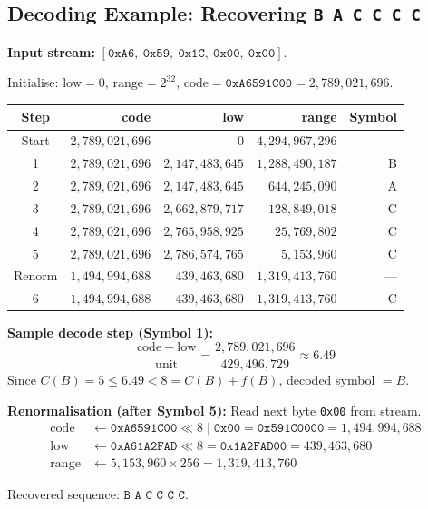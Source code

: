 \subsection{Decoding Example: Recovering \texttt{B A C C C C}}

\begin{examplebox}
\textbf{Input stream:}
$[\texttt{0xA6},\ \texttt{0x59},\ \texttt{0x1C},\ \texttt{0x00},
\ \texttt{0x00}]$.

Initialise: $\mathrm{low}=0$, $\mathrm{range}=2^{32}$,
$\mathrm{code} = \texttt{0xA6591C00} = 2{,}789{,}021{,}696$.

\medskip
\begin{center}
\begin{tabular}{@{}crrrr@{}}
\toprule
\textbf{Step} & \textbf{code} & \textbf{low} & \textbf{range} 
              & \textbf{Symbol} \\
\midrule
Start  & $2{,}789{,}021{,}696$ & $0$ & $4{,}294{,}967{,}296$ & — \\
1 & $2{,}789{,}021{,}696$ & $2{,}147{,}483{,}645$ & $1{,}288{,}490{,}187$ & B \\
2 & $2{,}789{,}021{,}696$ & $2{,}147{,}483{,}645$ & $644{,}245{,}090$ & A \\
3 & $2{,}789{,}021{,}696$ & $2{,}662{,}879{,}717$ & $128{,}849{,}018$ & C \\
4 & $2{,}789{,}021{,}696$ & $2{,}765{,}958{,}925$ & $25{,}769{,}802$ & C \\
5 & $2{,}789{,}021{,}696$ & $2{,}786{,}574{,}765$ & $5{,}153{,}960$ & C \\
Renorm & $1{,}494{,}994{,}688$ & $439{,}463{,}680$ & $1{,}319{,}413{,}760$ & — \\
6 & $1{,}494{,}994{,}688$ & $439{,}463{,}680$ & $1{,}319{,}413{,}760$ & C \\
\bottomrule
\end{tabular}
\end{center}

\medskip
\textbf{Sample decode step (Symbol 1):}
\[
  \frac{\mathrm{code} - \mathrm{low}}{\mathrm{unit}} 
  = \frac{2{,}789{,}021{,}696}{429{,}496{,}729} \approx 6.49
\]
Since $C(B) = 5 \leq 6.49 < 8 = C(B)+f(B)$, decoded symbol $= B$. \checkmark

\medskip
\textbf{Renormalisation (after Symbol 5):}
Read next byte \texttt{0x00} from stream.
\begin{align*}
  \mathrm{code} &\leftarrow \texttt{0xA6591C00} \ll 8 \mid \texttt{0x00}
                 = \texttt{0x591C0000} = 1{,}494{,}994{,}688 \\
  \mathrm{low}  &\leftarrow \texttt{0xA61A2FAD} \ll 8 
                 = \texttt{0x1A2FAD00} = 439{,}463{,}680 \\
  \mathrm{range}&\leftarrow 5{,}153{,}960 \times 256 = 1{,}319{,}413{,}760
\end{align*}

Recovered sequence: $\boxed{\texttt{B\ A\ C\ C\ C\ C}}$. \checkmark
\end{examplebox}

